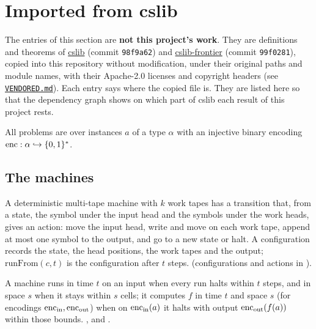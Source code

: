 \section{Imported from cslib}
\label{sec:cslib}

The entries of this section are \textbf{not this project's work}. They are definitions and
theorems of \href{https://github.com/leanprover/cslib}{cslib} (commit \texttt{98f9a62}) and
\href{https://github.com/cslib-community/cslib-frontier}{cslib-frontier} (commit \texttt{99f0281}),
copied into this repository without modification, under their original paths and module names,
with their Apache-2.0 licenses and copyright headers (see
\href{https://github.com/julatec/sagitta/blob/main/VENDORED.md}{\texttt{VENDORED.md}}). Each entry
says where the copied file is. They are listed here so that the dependency graph shows on which
part of cslib each result of this project rests.

All problems are over instances $a$ of a type $\alpha$ with an injective binary encoding
$\mathrm{enc} : \alpha \hookrightarrow \{0,1\}^*$.

\subsection{The machines}

\begin{definition}
  \label{def:cslib-tm}
  \leanok
  A deterministic multi-tape machine with $k$ work tapes has a transition that, from a state, the
  symbol under the input head and the symbols under the work heads, gives an action: move the input
  head, write and move on each work tape, append at most one symbol to the output, and go to a new
  state or halt. A configuration records the state, the head positions, the work tapes and the
  output; $\mathrm{runFrom}(c, t)$ is the configuration after $t$ steps.
  (configurations and actions in
  ).
\end{definition}

\begin{definition}
  \label{def:cslib-time-space}
  \leanok
  A machine runs in time $t$ on an input when every run halts within $t$ steps, and in space $s$
  when it stays within $s$ cells; it computes $f$ in time $t$ and space $s$ (for encodings
  $\mathrm{enc}_{\mathrm{in}}, \mathrm{enc}_{\mathrm{out}}$) when on $\mathrm{enc}_{\mathrm{in}}(a)$ it halts with output
  $\mathrm{enc}_{\mathrm{out}}(f(a))$ within those bounds.
  ,
   and
  .
\end{definition}

